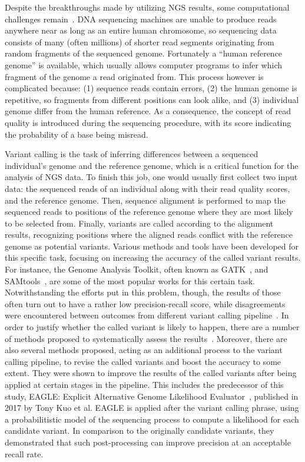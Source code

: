 \documentclass{PHlab-thesis}
\begin{document}
Despite the breakthroughs made by utilizing NGS results, some computational challenges remain~\cite{muzzey2015understanding}.  DNA sequencing machines are unable to produce reads anywhere near as long as an entire human chromosome, so sequencing data consists of many (often millions) of shorter read segments originating from random fragments of the sequenced genome.  Fortunately a ``human reference genome'' is available, which usually allows computer programs to infer which fragment of the genome a read originated from.  This process however is complicated because: (1) sequence reads contain errors, (2) the human genome is repetitive, so fragments from different positions can look alike, and (3) individual genome differ from the human reference. As a consequence, the concept of read quality is introduced during the sequencing procedure, with its score indicating the probability of a base being misread.

Variant calling is the task of inferring differences between a sequenced individual's genome and the reference genome, which is a critical function for the analysis of NGS data. To finish this job, one would usually first collect two input data: the sequenced reads of an individual along with their read quality scores, and the reference genome. Then, sequence alignment is performed to map the sequenced reads to positions of the reference genome where they are most likely to be selected from. Finally, variants are called according to the alignment results, recognizing positions where the aligned reads conflict with the reference genome as potential variants.
Various methods and tools have been developed for this specific task, focusing on increasing the accuracy of the called variant results. For instance, the Genome Analysis Toolkit, often known as GATK~\cite{mckenna2010genome}, and SAMtools~\cite{li2009sequence}, are some of the most popular works for this certain task. Notwithstanding the efforts put in this problem, though, the results of those often turn out to have a rather low precision-recall score, while disagreements were encountered between outcomes from different variant calling pipeline~\cite{o2013low}. In order to justify whether the called variant is likely to happen, there are a number of methods proposed to systematically assess the results~\cite{hwang2015systematic,yu2013comparing}. Moreover, there are also several methods proposed, acting as an additional process to the variant calling pipeline, to revise the called variants and boost the accuracy to some extent. They were shown to improve the results of the called variants after being applied at certain stages in the pipeline. This includes the predecessor of this study, EAGLE: Explicit Alternative Genome Likelihood Evaluator~\cite{kuo2018eagle}, published in 2017 by Tony Kuo et al.  EAGLE is applied after the variant calling phrase, using a probabilitistic model of the sequencing process to compute a likelihood for each candidate variant.  In comparison to the originally candidate variants, they demonstrated that such post-processing can improve precision at an acceptable recall rate.
\end{document}

